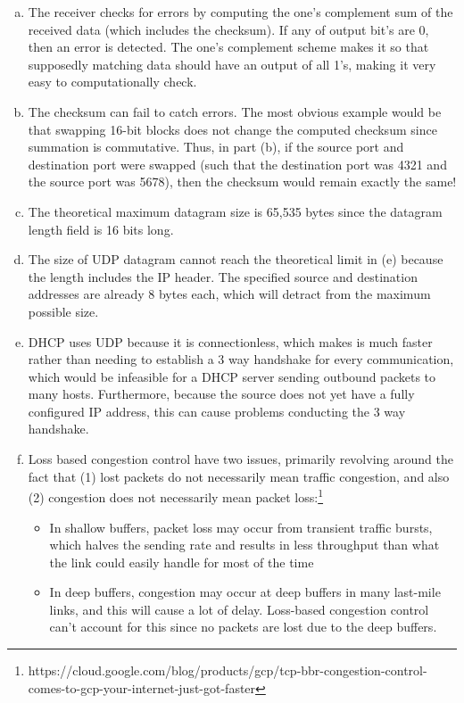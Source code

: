 \documentclass[11pt]{article}
\begin{document}
\begin{enumerate}[(a)]
    \item
      The receiver checks for errors by computing the one's complement sum of the
      received data (which includes the checksum). If any of output bit's are 0,
      then an error is detected. The one's complement scheme makes it so that supposedly
      matching data should have an output of all 1's, making it very easy to
      computationally check.
    \item
      The checksum can fail to catch errors. The most obvious example would be that
      swapping 16-bit blocks does not change the computed checksum since summation
      is commutative. Thus, in part (b), if the source port and destination port
      were swapped (such that the destination port was 4321 and the source port
      was 5678), then the checksum would remain exactly the same!
    \item
      The theoretical maximum datagram size is 65,535 bytes since the datagram length
      field is 16 bits long.
    \item
      The size of UDP datagram cannot reach the theoretical limit in (e) because the
      length includes the IP header. The specified source and destination addresses
      are already 8 bytes each, which will detract from the maximum possible size.
    \item
      DHCP uses UDP because it is connectionless, which makes is much faster rather
      than needing to establish a 3 way handshake for every communication, which
      would be infeasible for a DHCP server sending outbound packets to many hosts.
      Furthermore, because the source does not yet have a fully configured IP
      address, this can cause problems conducting the 3 way handshake.
    \item
      Loss based congestion control have two issues, primarily revolving around the
      fact that (1) lost packets do not necessarily mean traffic congestion, and also
      (2) congestion does not necessarily mean packet loss:\footnote{https://cloud.google.com/blog/products/gcp/tcp-bbr-congestion-control-comes-to-gcp-your-internet-just-got-faster}
      \begin{itemize}
        \item
          In shallow buffers, packet loss may occur from transient traffic bursts,
          which halves the sending rate and results in less throughput than
          what the link could easily handle for most of the time
        \item
          In deep buffers, congestion may occur at deep buffers in many last-mile
          links, and this will cause a lot of delay. Loss-based congestion control
          can't account for this since no packets are lost due to the deep buffers.


\end{itemize}
\end{enumerate}
\end{document}
